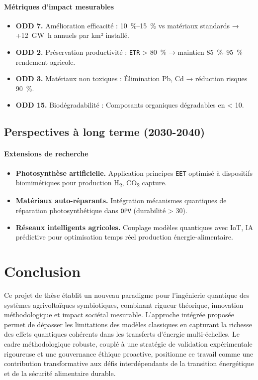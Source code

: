 \documentclass[12pt, a4paper]{article}
\begin{document}
\paragraph{Métriques d'impact mesurables}
\begin{itemize}
    \item \textbf{ODD 7.} Amélioration efficacité : \SIrange{+10}{+15}{\percent} vs matériaux standards → +\SI{12}{\giga\watt\hour} annuels par km² installé.
    \item \textbf{ODD 2.} Préservation productivité : \texttt{ETR} > \SI{80}{\percent} → maintien \SIrange{85}{95}{\percent} rendement agricole.
    \item \textbf{ODD 3.} Matériaux non toxiques : Élimination Pb, Cd → réduction risques \SI{90}{\percent}.
    \item \textbf{ODD 15.} Biodégradabilité : Composants organiques dégradables en < \SI{10}{\year}.
\end{itemize}

\subsection{Perspectives à long terme (2030-2040)}

\paragraph{Extensions de recherche}
\begin{itemize}
    \item \textbf{Photosynthèse artificielle.} Application principes \texttt{EET} optimisé à dispositifs biomimétiques pour production H\textsubscript{2}, CO\textsubscript{2} capture.
    \item \textbf{Matériaux auto-réparants.} Intégration mécanismes quantiques de réparation photosynthétique dans \texttt{OPV} (durabilité > \SI{30}{\year}).
    \item \textbf{Réseaux intelligents agricoles.} Couplage modèles quantiques avec IoT, IA prédictive pour optimisation temps réel production énergie-alimentaire.
\end{itemize}

\section*{Conclusion}

Ce projet de thèse établit un nouveau paradigme pour l'ingénierie quantique des systèmes agrivoltaïques symbiotiques, combinant rigueur théorique, innovation méthodologique et impact sociétal mesurable. L'approche intégrée proposée permet de dépasser les limitations des modèles classiques en capturant la richesse des effets quantiques cohérents dans les transferts d'énergie multi-échelles. Le cadre méthodologique robuste, couplé à une stratégie de validation expérimentale rigoureuse et une gouvernance éthique proactive, positionne ce travail comme une contribution transformative aux défis interdépendants de la transition énergétique et de la sécurité alimentaire durable.
\end{document}
